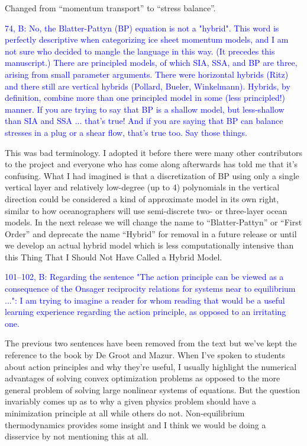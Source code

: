\documentclass{article}
\theoremstyle{definition}
\theoremstyle{plain}
\begin{document}
Changed from ``momentum transport'' to ``stress balance''.

\textcolor{blue}{74, B:  No, the Blatter-Pattyn (BP) equation is not a "hybrid".  This word is perfectly descriptive when categorizing ice sheet momentum models, and I am not sure who decided to mangle the language in this way.  (It precedes this manuscript.)  There are principled models, of which SIA, SSA, and BP are three, arising from small parameter arguments.  There were horizontal hybrids (Ritz) and there still are vertical hybrids (Pollard, Bueler, Winkelmann).  Hybrids, by definition, combine more than one principled model in some (less principled!) manner.  If you are trying to say that BP is a shallow model, but less-shallow than SIA and SSA ... that's true!  And if you are saying that BP can balance stresses in a plug or a shear flow, that's true too.  Say those things.}

This was bad terminology.
I adopted it before there were many other contributors to the project and everyone who has come along afterwards has told me that it's confusing.
What I had imagined is that a discretization of BP using only a single vertical layer and relatively low-degree (up to 4) polynomials in the vertical direction could be considered a kind of approximate model in its own right, similar to how oceanographers will use semi-discrete two- or three-layer ocean models.
In the next release we will change the name to ``Blatter-Pattyn'' or ``First Order'' and deprecate the name ``Hybrid'' for removal in a future release or until we develop an actual hybrid model which is less computationally intensive than this Thing That I Should Not Have Called a Hybrid Model.

\textcolor{blue}{101--102, B:  Regarding the sentence "The action principle can be viewed as a consequence of the Onsager reciprocity relations for systems near to equilibrium ...":  I am trying to imagine a reader for whom reading that would be a useful learning experience regarding the action principle, as opposed to an irritating one.}

The previous two sentences have been removed from the text but we've kept the reference to the book by De Groot and Mazur.
When I've spoken to students about action principles and why they're useful, I usually highlight the numerical advantages of solving convex optimization problems as opposed to the more general problem of solving large nonlinear systems of equations.
But the question invariably comes up as to why a given physics problem should have a minimization principle at all while others do not.
Non-equilibrium thermodynamics provides some insight and I think we would be doing a disservice by not mentioning this at all.
\end{document}
